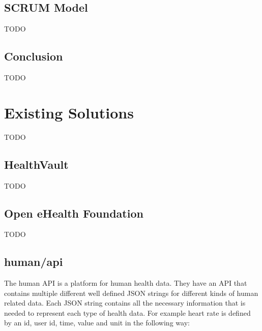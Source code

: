 
\subsection{SCRUM Model}

TODO

\subsection{Conclusion}

TODO


\section{Existing Solutions}

TODO

\subsection{HealthVault}

TODO

\subsection{Open eHealth Foundation}

TODO

\subsection{human/api}

The human API is a platform for human health data. 
They have an API that contains multiple different well defined JSON strings for different kinds of human related data.
Each JSON string contains all the necessary information that is needed to represent each type of health data.
For example heart rate is defined by an id, user id, time, value and unit in the following way:


